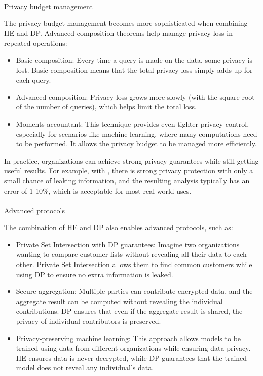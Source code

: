 \documentclass[
  letterpaper,
  DIV=11,
  numbers=noendperiod,
  oneside]{scrartcl}
\makeatletter
\let\oldparagraph\paragraph
\renewcommand{\paragraph}{
    \@ifstar
      \xxxParagraphStar
      \xxxParagraphNoStar
  }
\newcommand{\xxxParagraphStar}[1]{\oldparagraph*{#1}\mbox{}}
\newcommand{\xxxParagraphNoStar}[1]{\oldparagraph{#1}\mbox{}}
\makeatother
\begin{document}
\paragraph{Privacy budget management}\label{privacy-budget-management}

The privacy budget management becomes more sophisticated when combining
HE and DP. Advanced composition theorems help manage privacy loss in
repeated operations:

\begin{itemize}
\item
  Basic composition: Every time a query is made on the data, some
  privacy is lost. Basic composition means that the total privacy loss
  simply adds up for each query.
\item
  Advanced composition: Privacy loss grows more slowly (with the square
  root of the number of queries), which helps limit the total loss.
\item
  Moments accountant: This technique provides even tighter privacy
  control, especially for scenarios like machine learning, where many
  computations need to be performed. It allows the privacy budget to be
  managed more efficiently.
\end{itemize}

In practice, organizations can achieve strong privacy guarantees while
still getting useful results. For example, with , there is strong
privacy protection with only a small chance of leaking information, and
the resulting analysis typically has an error of 1-10\%, which is
acceptable for most real-world uses.

\paragraph{Advanced protocols}\label{advanced-protocols}

The combination of HE and DP also enables advanced protocols, such as:

\begin{itemize}
\item
  Private Set Intersection with DP guarantees: Imagine two organizations
  wanting to compare customer lists without revealing all their data to
  each other. Private Set Intersection allows them to find common
  customers while using DP to ensure no extra information is leaked.
\item
  Secure aggregation: Multiple parties can contribute encrypted data,
  and the aggregate result can be computed without revealing the
  individual contributions. DP ensures that even if the aggregate result
  is shared, the privacy of individual contributors is preserved.
\item
  Privacy-preserving machine learning: This approach allows models to be
  trained using data from different organizations while ensuring data
  privacy. HE ensures data is never decrypted, while DP guarantees that
  the trained model does not reveal any individual's data.
\end{itemize}
\end{document}
